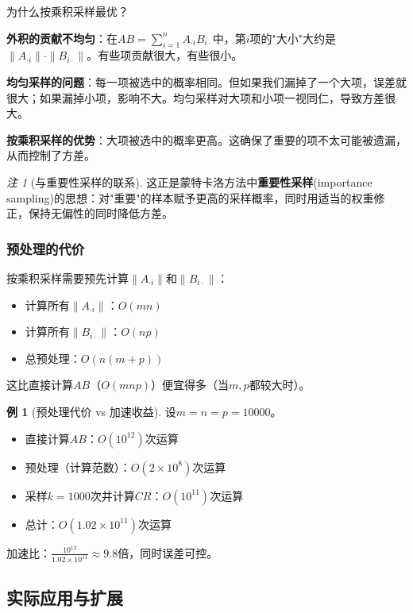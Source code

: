 \documentclass[11pt,a4paper]{ctexart}
\theoremstyle{definition}
\newtheorem{example}[theorem]{例}
\theoremstyle{remark}
\newtheorem{remark}[theorem]{注}
\begin{document}
为什么按乘积采样最优？

\textbf{外积的贡献不均匀}：在$AB = \sum_{i=1}^n A_{\cdot i} B_{i\cdot}$中，第$i$项的"大小"大约是$\|A_{\cdot i}\| \cdot \|B_{i\cdot}\|$。有些项贡献很大，有些很小。

\textbf{均匀采样的问题}：每一项被选中的概率相同。但如果我们漏掉了一个大项，误差就很大；如果漏掉小项，影响不大。均匀采样对大项和小项一视同仁，导致方差很大。

\textbf{按乘积采样的优势}：大项被选中的概率更高。这确保了重要的项不太可能被遗漏，从而控制了方差。

\begin{remark}[与重要性采样的联系]
这正是蒙特卡洛方法中\textbf{重要性采样}(importance sampling)的思想：对"重要"的样本赋予更高的采样概率，同时用适当的权重修正，保持无偏性的同时降低方差。
\end{remark}

\subsubsection{预处理的代价}

按乘积采样需要预先计算$\|A_{\cdot i}\|$和$\|B_{i\cdot}\|$：
\begin{itemize}
    \item 计算所有$\|A_{\cdot i}\|$：$O(mn)$
    \item 计算所有$\|B_{i\cdot}\|$：$O(np)$
    \item 总预处理：$O(n(m+p))$
\end{itemize}

这比直接计算$AB$（$O(mnp)$）便宜得多（当$m, p$都较大时）。

\begin{example}[预处理代价 vs 加速收益]
设$m = n = p = 10000$。
\begin{itemize}
    \item 直接计算$AB$：$O(10^{12})$次运算
    \item 预处理（计算范数）：$O(2 \times 10^8)$次运算
    \item 采样$k = 1000$次并计算$CR$：$O(10^{11})$次运算
    \item 总计：$O(1.02 \times 10^{11})$次运算
\end{itemize}

加速比：$\frac{10^{12}}{1.02 \times 10^{11}} \approx 9.8$倍，同时误差可控。
\end{example}


\subsection{实际应用与扩展}
\end{document}
